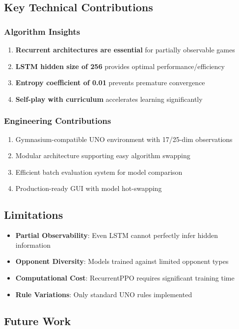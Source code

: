 \documentclass[12pt,a4paper]{article}
\begin{document}
\subsection{Key Technical Contributions}
\subsubsection{Algorithm Insights}
\begin{enumerate}
    \item \textbf{Recurrent architectures are essential} for partially observable games
    \item \textbf{LSTM hidden size of 256} provides optimal performance/efficiency
    \item \textbf{Entropy coefficient of 0.01} prevents premature convergence
    \item \textbf{Self-play with curriculum} accelerates learning significantly
\end{enumerate}
\subsubsection{Engineering Contributions}
\begin{enumerate}
    \item Gymnasium-compatible UNO environment with 17/25-dim observations
    \item Modular architecture supporting easy algorithm swapping
    \item Efficient batch evaluation system for model comparison
    \item Production-ready GUI with model hot-swapping
\end{enumerate}
\subsection{Limitations}
\begin{itemize}
    \item \textbf{Partial Observability}: Even LSTM cannot perfectly infer hidden information
    \item \textbf{Opponent Diversity}: Models trained against limited opponent types
    \item \textbf{Computational Cost}: RecurrentPPO requires significant training time
    \item \textbf{Rule Variations}: Only standard UNO rules implemented
\end{itemize}
\subsection{Future Work}
\end{document}
